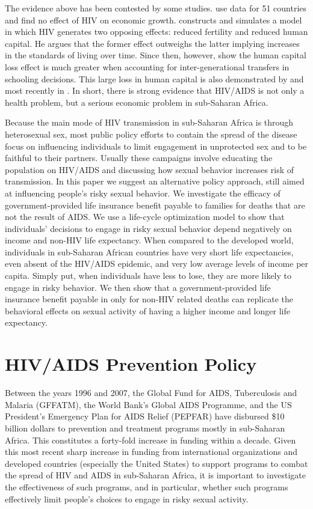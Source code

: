 \documentclass[12pt]{article}
\newcommand{\citee}[1]{\citet*{#1}}
\begin{document}
The evidence above has been contested by some studies. \citee{BM1997} use data for 51 countries and find no effect of HIV on economic growth. \citee{AY2005a} constructs and simulates a model in which HIV generates two opposing effects: reduced fertility and reduced human capital. He argues that the former effect outweighs the latter implying increases in the standards of living over time. Since then, however, \citee{CGM2005} show the human capital loss effect is much greater when accounting for inter-generational transfers in schooling decisions.  This large loss in human capital is also demonstrated by \citee{HB2002} and most recently in \citee{JF2008}.  In short, there is strong evidence that HIV/AIDS is not only a health problem, but a serious economic problem in sub-Saharan Africa.

Because the main mode of HIV transmission in sub-Saharan Africa is through heterosexual sex, most public policy efforts to contain the spread of the disease focus on influencing individuals to limit engagement in unprotected sex and to be faithful to their partners.  Usually these campaigns involve educating the population on HIV/AIDS and discussing how sexual behavior increases risk of transmission.  In this paper we suggest an alternative policy approach, still aimed at influencing people's risky sexual behavior.  We investigate the efficacy of government-provided life insurance benefit payable to families for deaths that are not the result of AIDS.  We use a life-cycle optimization model to show that individuals' decisions to engage in risky sexual behavior depend negatively on income and non-HIV life expectancy.  When compared to the developed world, individuals in sub-Saharan African countries have very short life expectancies, even absent of the HIV/AIDS epidemic, and very low average levels of income per capita.  Simply put, when individuals have less to lose, they are more likely to engage in risky behavior.  We then show that a government-provided life insurance benefit payable in only for non-HIV related deaths can replicate the behavioral effects on sexual activity of having a higher income and longer life expectancy.

\section{HIV/AIDS Prevention Policy}
Between the years 1996 and 2007, the Global Fund for AIDS, Tuberculosis and Malaria (GFFATM), the World Bank's Global AIDS Programme, and the US President's Emergency Plan for AIDS Relief (PEPFAR) have disbursed \$10 billion dollars to prevention and treatment programs mostly in sub-Saharan Africa. This constitutes a forty-fold increase in funding within a decade.  Given this most recent sharp increase in funding from international organizations and developed countries (especially the United States) to support programs to combat the spread of HIV and AIDS in sub-Saharan Africa, it is important to investigate the effectiveness of such programs, and in particular, whether such programs effectively limit people's choices to engage in risky sexual activity.
\end{document}
